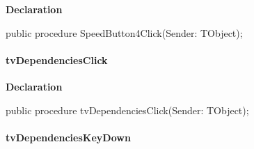 \documentclass{report}
\newif\ifpdf
\begin{document}
\label{prjwizard.TfrmProjectWizard-SpeedButton4Click}
\begin{list}{}{
\setlength{\itemindent}{0cm}
\setlength{\listparindent}{0cm}
\setlength{\leftmargin}{\evensidemargin}
\addtolength{\leftmargin}{\tmplength}
\settowidth{\labelsep}{X}
\addtolength{\leftmargin}{\labelsep}
\setlength{\labelwidth}{\tmplength}
}
\item[\textbf{Declaration}\hfill]
\ifpdf
\begin{flushleft}
\fi
\begin{ttfamily}
public procedure SpeedButton4Click(Sender: TObject);\end{ttfamily}

\ifpdf
\end{flushleft}
\fi

\end{list}
\paragraph*{tvDependenciesClick}\hspace*{\fill}

\label{prjwizard.TfrmProjectWizard-tvDependenciesClick}
\begin{list}{}{
\setlength{\itemindent}{0cm}
\setlength{\listparindent}{0cm}
\setlength{\leftmargin}{\evensidemargin}
\addtolength{\leftmargin}{\tmplength}
\settowidth{\labelsep}{X}
\addtolength{\leftmargin}{\labelsep}
\setlength{\labelwidth}{\tmplength}
}
\item[\textbf{Declaration}\hfill]
\ifpdf
\begin{flushleft}
\fi
\begin{ttfamily}
public procedure tvDependenciesClick(Sender: TObject);\end{ttfamily}

\ifpdf
\end{flushleft}
\fi

\end{list}
\paragraph*{tvDependenciesKeyDown}\hspace*{\fill}
\end{document}
